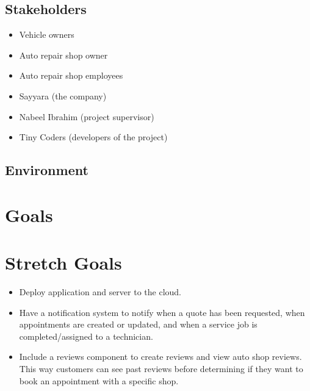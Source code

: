 \documentclass{article}
\begin{document}
\subsection{Stakeholders}
\begin{itemize}
    \item Vehicle owners
    \item Auto repair shop owner
    \item Auto repair shop employees
    \item Sayyara (the company)
    \item Nabeel Ibrahim (project supervisor)
    \item Tiny Coders (developers of the project)
\end{itemize}

\subsection{Environment}


\section{Goals}

\section{Stretch Goals}
\begin{itemize}
    \item Deploy application and server to the cloud.
    \item Have a notification system to notify when a quote has been requested, when appointments are created or updated, and when a service job is completed/assigned to a technician.
    \item Include a reviews component to create reviews and view auto shop reviews. This way customers can see past reviews before determining if they want to book an appointment with a specific shop.
\end{itemize}
\end{document}
